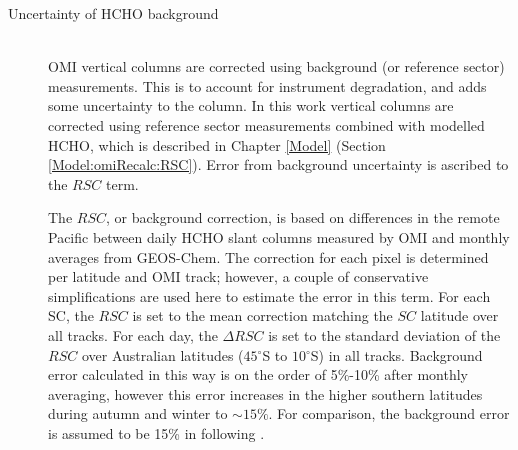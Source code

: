 \documentclass[acp, manuscript]{copernicus}
\newcommand{\parencite}{\citep}
\newcommand{\textcite}{\citet}
\newcommand{\degr}{$^{\circ}$}
\begin{document}
\begin{description}
        
      \item [Uncertainty of HCHO background] \hfill \\
        OMI vertical columns are corrected using background (or reference sector) measurements.
        This is to account for instrument degradation, and adds some uncertainty to the column.
        In this work vertical columns are corrected using reference sector measurements combined with modelled HCHO, which is described in Chapter \ref{Model} (Section \ref{Model:omiRecalc:RSC}).
        Error from background uncertainty is ascribed to the $RSC$ term.
        
        The $RSC$, or background correction, is based on differences in the remote Pacific between daily HCHO slant columns measured by OMI and monthly averages from GEOS-Chem.
        The correction for each pixel is determined per latitude and OMI track; however, a couple of conservative simplifications are used here to estimate the error in this term.
        For each SC, the $RSC$ is set to the mean correction matching the $SC$ latitude over all tracks.
        For each day, the $\Delta RSC$ is set to the standard deviation of the $RSC$ over Australian latitudes ($45$\degr S to $10$\degr S) in all tracks.
        Background error calculated in this way is on the order of 5\%-10\% after monthly averaging, however this error increases in the higher southern latitudes during autumn and winter to $\sim{15}\%$.
        For comparison, the background error is assumed to be 15\% in \textcite{Curci2010} following \parencite{Dufour2009}.
        

\end{description}
\end{document}

